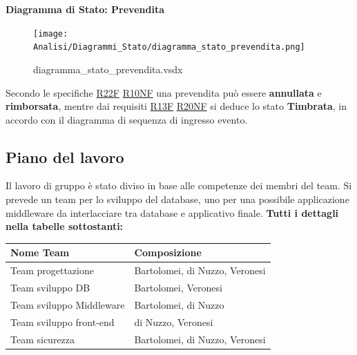 \documentclass[a4paper]{article}
\begin{document}
\textbf{Diagramma di Stato: Prevendita}

\begin{figure}[H]
    \texttt{[image: Analisi/Diagrammi\_Stato/diagramma\_stato\_prevendita.png]}
    \centering
    \caption{diagramma\_stato\_prevendita.vsdx}
\end{figure}

Secondo le specifiche \hyperlink{R22F}{R22F} \hyperlink{R10NF}{R10NF} una prevendita può essere \textbf{annullata} e \textbf{rimborsata}, mentre dai requisiti \hyperlink{R13F}{R13F} \hyperlink{R20NF}{R20NF} si deduce lo stato \textbf{Timbrata}, in accordo con il diagramma di sequenza di ingresso evento.

\newpage

\subsection{Piano del lavoro}

Il lavoro di gruppo è stato diviso in base alle competenze dei membri del team. Si prevede un team per lo sviluppo del database, uno per una possibile applicazione middleware da interlacciare tra database e applicativo finale. \textbf{Tutti i dettagli nella tabelle sottostanti:}

\begin{center}
    \begin{tabularx}{1\textwidth}{|X|X|}
        \hline
        \textbf{Nome Team} & \textbf{Composizione}\\
        \hline
        \hline
        Team progettazione & Bartolomei, di Nuzzo, Veronesi\\
        \hline
        Team sviluppo DB & Bartolomei, Veronesi\\
        \hline
        Team sviluppo Middleware & Bartolomei, di Nuzzo\\
        \hline
        Team sviluppo front-end & di Nuzzo, Veronesi\\
        \hline
        Team sicurezza & Bartolomei, di Nuzzo, Veronesi\\
        \hline
    \end{tabularx}
\end{center}
\end{document}

